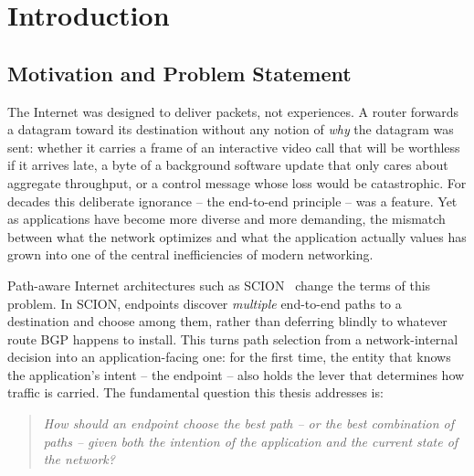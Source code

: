 \chapter{Introduction}
\label{ch:introduction}

\section{Motivation and Problem Statement}
\label{sec:intro:motivation}

The Internet was designed to deliver packets, not experiences. A router forwards a datagram
toward its destination without any notion of \emph{why} the datagram was sent: whether it
carries a frame of an interactive video call that will be worthless if it arrives late, a
byte of a background software update that only cares about aggregate throughput, or a
control message whose loss would be catastrophic. For decades this deliberate ignorance --
the end-to-end principle -- was a feature. Yet as applications have become more diverse and
more demanding, the mismatch between what the network optimizes and what the application
actually values has grown into one of the central inefficiencies of modern networking.

Path-aware Internet architectures such as SCION~\cite{Perrig2017} change the terms of this
problem. In SCION, endpoints discover \emph{multiple} end-to-end paths to a destination and
choose among them, rather than deferring blindly to whatever route BGP happens to install.
This turns path selection from a network-internal decision into an application-facing one:
for the first time, the entity that knows the application's intent -- the endpoint -- also
holds the lever that determines how traffic is carried. The fundamental question this thesis addresses is:

\begin{quote}
\itshape How should an endpoint choose the best path -- or the best \emph{combination} of
paths -- given both the intention of the application and the current state of the network?
\end{quote}

